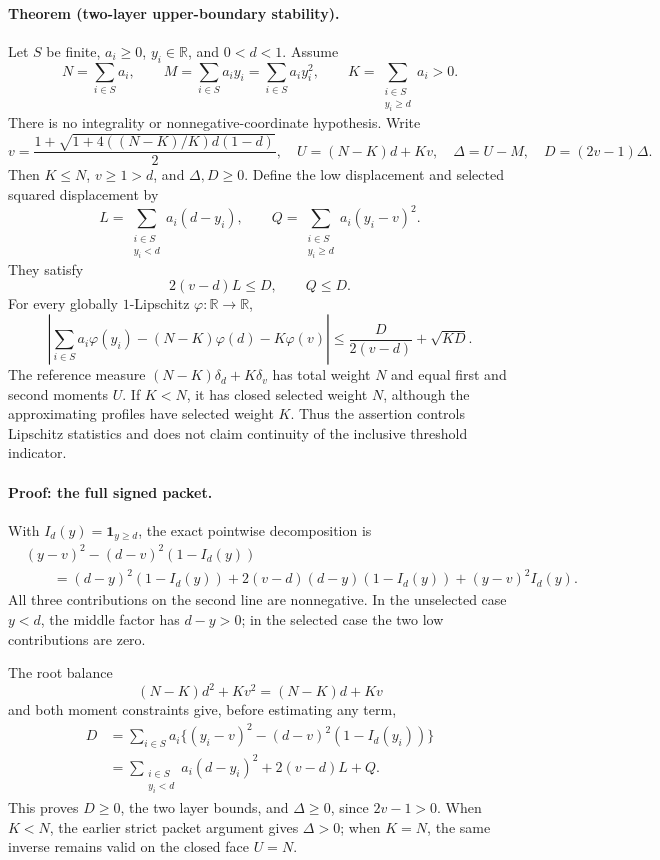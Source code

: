 \paragraph{Theorem (two-layer upper-boundary stability).}
Let \(S\) be finite, \(a_i\ge0\), \(y_i\in\mathbb R\), and \(0<d<1\).
Assume
\[
 N=\sum_{i\in S}a_i,\qquad
 M=\sum_{i\in S}a_i y_i=\sum_{i\in S}a_i y_i^2,\qquad
 K=\sum_{\substack{i\in S\\y_i\ge d}}a_i>0.
\]
There is no integrality or nonnegative-coordinate hypothesis.
Write
\[
 v=\frac{1+\sqrt{1+4((N-K)/K)d(1-d)}}2,\quad
 U=(N-K)d+Kv,\quad \Delta=U-M,\quad D=(2v-1)\Delta.
\]
Then \(K\le N\), \(v\ge1>d\), and \(\Delta,D\ge0\).
Define the low displacement and selected squared displacement by
\[
 L=\sum_{\substack{i\in S\\y_i<d}}a_i(d-y_i),\qquad
 Q=\sum_{\substack{i\in S\\y_i\ge d}}a_i(y_i-v)^2.
\]
They satisfy
\[
 2(v-d)L\le D,\qquad Q\le D.
\]
For every globally \(1\)-Lipschitz \(\varphi:\mathbb R\to\mathbb R\),
\begin{equation}
 \left|\sum_{i\in S}a_i\varphi(y_i)
       -(N-K)\varphi(d)-K\varphi(v)\right|
 \le \frac{D}{2(v-d)}+\sqrt{KD}.
 \label{eq:threshold-total-stability}
\end{equation}
The reference measure \((N-K)\delta_d+K\delta_v\) has total weight \(N\)
and equal first and second moments \(U\).  If \(K<N\), it has closed
selected weight \(N\), although the approximating profiles have selected
weight \(K\).  Thus the assertion controls Lipschitz statistics and does
not claim continuity of the inclusive threshold indicator.

\paragraph{Proof: the full signed packet.}
With \(I_d(y)=\mathbf1_{y\ge d}\), the exact pointwise decomposition is
\begin{align*}
 &(y-v)^2-(d-v)^2(1-I_d(y))\\
 &\qquad=(d-y)^2(1-I_d(y))
       +2(v-d)(d-y)(1-I_d(y))+(y-v)^2I_d(y).
\end{align*}
All three contributions on the second line are nonnegative.  In the
unselected case \(y<d\), the middle factor has \(d-y>0\); in the
selected case the two low contributions are zero.

The root balance
\[
 (N-K)d^2+Kv^2=(N-K)d+Kv
\]
and both moment constraints give, before estimating any term,
\begin{align*}
 D&=\sum_{i\in S}a_i\bigl\{(y_i-v)^2-(d-v)^2(1-I_d(y_i))\bigr\}\\
  &=\sum_{\substack{i\in S\\y_i<d}}a_i(d-y_i)^2+2(v-d)L+Q.
\end{align*}
This proves \(D\ge0\), the two layer bounds, and \(\Delta\ge0\), since
\(2v-1>0\).  When \(K<N\), the earlier strict packet argument gives
\(\Delta>0\); when \(K=N\), the same inverse remains valid on the closed
face \(U=N\).

